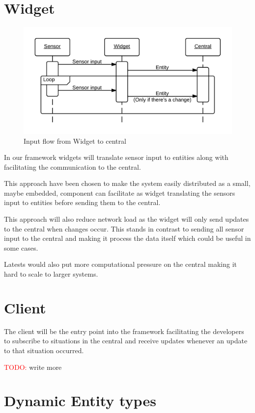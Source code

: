 \documentclass[]{report}
\newcommand\todo[1]{\textcolor{red}{TODO: }#1\PackageWarning{TODO:}{TODO tag!!}}
\begin{document}
\section{Widget}

\begin{figure}
\centering
\includegraphics[width=\linewidth]{sequencediagram-widget.png}
\caption{Input flow from Widget to central}
\label{fig:seqwidget}
\end{figure}


In our framework widgets will translate sensor input to entities along with facilitating the communication to the central.

This approach have been chosen to make the system easily distributed as a small, maybe embedded, component can facilitate as widget translating the sensors input to entities before sending them to the central.

This approach will also reduce network load as the widget will only send updates to the central when changes occur. This stands in contrast to sending all sensor input to the central and making it process the data itself which could be useful in some cases.

Latests would also put more computational pressure on the central making it hard to scale to larger systems.


\section{Client}

The client will be the entry point into the framework facilitating the developers to subscribe to situations in the central and receive updates whenever an update to that situation occurred. 

\todo write more

\section{Dynamic Entity types}
\end{document}
